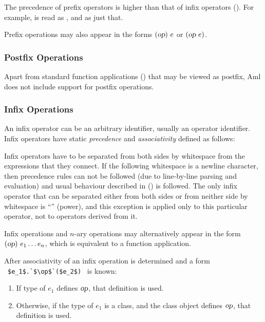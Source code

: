 The precedence of prefix operators is higher than that of infix operators (). For example,  is read as , and  as just that. 

Prefix operations may also appear in the forms $(\mbox{\sl op})\ e$ or $(\mbox{\sl op}\ e)$. 





\subsubsection{Postfix Operations}

Apart from standard function applications () that may be viewed as postfix, Aml does not include support for postfix operations. 





\subsubsection{Infix Operations}
\label{sec:infix-operations}

An infix operator can be an arbitrary identifier, usually an operator identifier. Infix operators have static {\em precedence} and {\em associativity} defined as follows:

Infix operators have to be separated from both sides by whitespace from the expressions that they connect. If the following whitespace is a newline character, then precedence rules can not be followed (due to line-by-line parsing and evaluation) and usual behaviour described in () is followed. The only infix operator that can be separated either from both sides or from neither side by whitespace is ``\code{^}'' (power), and this exception is applied only to this particular operator, not to operators derived from it. 

Infix operations and $n$-ary operations may alternatively appear in the form $(\mbox{\sl op})\ e_1 \ldots e_n$, which is equivalent to a function application. 

After associativity of an infix operation is determined and a form ~\lstinline!$e_1$.`$\op$`($e_2$)!~ is known:
\begin{enumerate}
  \item If type of $e_1$ defines $\mbox{\sl op}$, that definition is used. 
  \item Otherwise, if the type of $e_1$ is a class, and the class object defines $\mbox{\sl op}$, that definition is used. 
\end{enumerate}

